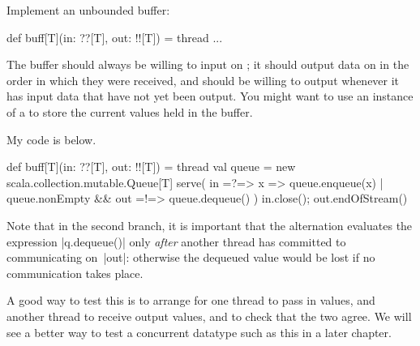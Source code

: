 \begin{question}
Implement an unbounded buffer:
%
\begin{scala}
def buff[T](in: ??[T], out: !![T]) = thread{ ... }
\end{scala}
%
The buffer should always be willing to input on ; it should output
data on  in the order in which they were received, and should be
willing to output whenever it has input data that have not yet been output. 
%
You might want to use an instance of a 
to store the current values held in the buffer.
\end{question}


\begin{answerI}
My code is below. 
\begin{scala}
  def buff[T](in: ??[T], out: !![T]) = thread{
    val queue = new scala.collection.mutable.Queue[T]
    serve(
      in =?=> { x => queue.enqueue(x) }
      | queue.nonEmpty && out =!=> { queue.dequeue() }
    )
    in.close(); out.endOfStream()
  }
\end{scala}
%
Note that in the second branch, it is important that the alternation evaluates
the expression |q.dequeue()| only \emph{after} another thread has committed to
communicating on~|out|: otherwise the dequeued value would be lost if no
communication takes place. 

A good way to test this is to arrange for one thread to pass in values, and
another thread to receive output values, and to check that the two agree.  We
will see a better way to test a concurrent datatype such as this in a later
chapter. 
\end{answerI}

